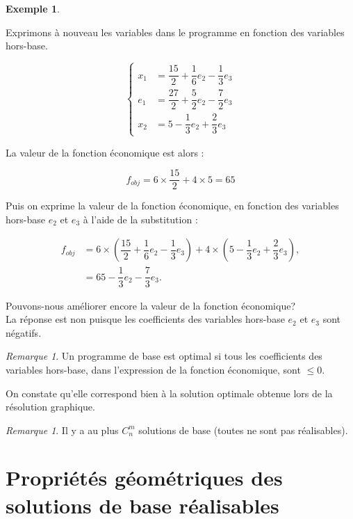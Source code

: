 \documentclass[a4paper,12pt,openany]{book}
\theoremstyle{plain}
\theoremstyle{definition}
\newtheorem{exemple}[theorem]{Exemple}
\theoremstyle{remark}
\newtheorem{remarque}[theorem]{Remarque}
\theoremstyle{nbstyle}
\begin{document}
\begin{exemple}
\begin{description}
			Exprimons à nouveau les variables dans le programme en fonction des variables hors-base.
			
			$$
			\left\{\begin{aligned}
			x_{1} & =\dfrac{15}{2}+\dfrac{1}{6} e_{2}-\dfrac{1}{3} e_{3} \\
			e_{1} & =\dfrac{27}{2}+\dfrac{5}{2} e_{2}-\dfrac{7}{2} e_{3} \\
			x_{2} & =5-\dfrac{1}{3} e_{2}+\dfrac{2}{3} e_{3}
			\end{aligned}\right.
			$$
			
			La valeur de la fonction économique est alors :
			
			$$
			f_{o b j}=6 \times \dfrac{15}{2}+4 \times 5=65
			$$
			
			Puis on exprime la valeur de la fonction économique, en fonction des variables hors-base $e_{2}$ et $e_{3}$ à l'aide de la substitution :
			
			$$
			\begin{aligned}
			f_{o b j} & =6 \times\left(\dfrac{15}{2}+\dfrac{1}{6} e_{2}-\dfrac{1}{3} e_{3}\right)+4 \times\left(5-\dfrac{1}{3} e_{2}+\dfrac{2}{3} e_{3}\right), \\
			& =65-\dfrac{1}{3} e_{2}-\dfrac{7}{3} e_{3} .
			\end{aligned}
			$$
			
			Pouvons-nous améliorer encore la valeur de la fonction économique?\\
			La réponse est non puisque les coefficients des variables hors-base $e_{2}$ et $e_{3}$ sont négatifs.
		\end{description}
	\end{exemple}
	\begin{remarque}
		Un programme de base est optimal si tous les coefficients des variables hors-base, dans l'expression de la fonction économique, sont $\leq 0$.
	\end{remarque}
	\label{rem:2.3}
	
	On constate qu'elle correspond bien à la solution optimale obtenue lors de la résolution graphique.
	
	\begin{remarque}
		Il y a au plus $C_{n}^{m}$ solutions de base (toutes ne sont pas réalisables).
	\end{remarque}
	\label{rem:2.4}
	
	\section{Propriétés géométriques des solutions de base réalisables}
	
\end{document}
